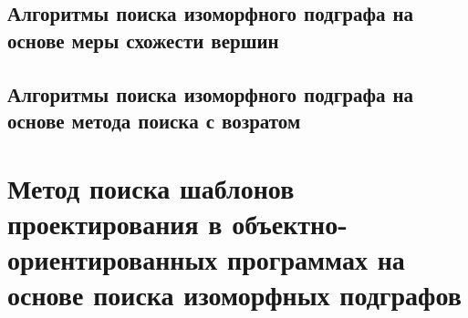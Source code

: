 \subsection{Алгоритмы поиска изоморфного подграфа на основе меры схожести вершин}

\cite{SimilarityGraphVertices}

\subsection{Алгоритмы поиска изоморфного подграфа на основе метода поиска с возратом}

\cite{SubgraphIsomorphism}

\section{Метод поиска шаблонов проектирования в объектно-ориентированных программах на основе поиска изоморфных подграфов}


